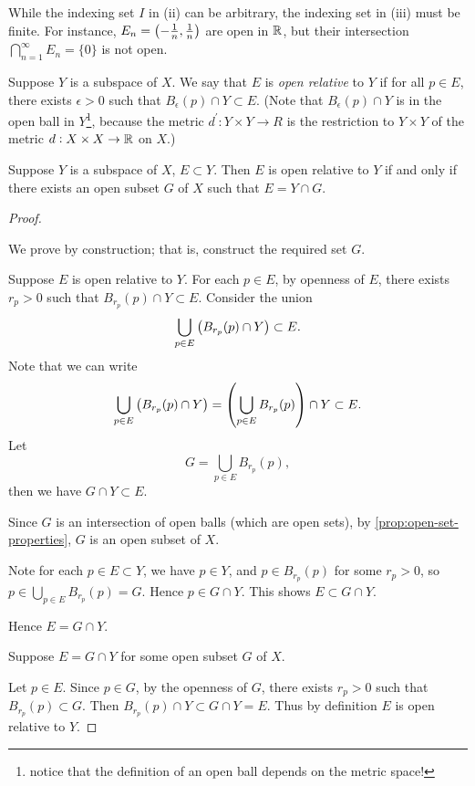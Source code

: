 \begin{remark}
While the indexing set $I$ in (ii) can be arbitrary, the indexing set in (iii) must be finite. For instance, $E_n=\left(-\frac{1}{n},\frac{1}{n}\right)$ are open in $\mathbb R$, but their intersection $\bigcap_{n=1}^\infty E_n=\{0\}$ is not open.
\end{remark}

Suppose $Y$ is a subspace of $X$. We say that $E$ is \emph{open relative} to $Y$ if for all $p\in E$, there exists $\epsilon>0$ such that $B_\epsilon(p)\cap Y\subset E$. (Note that $B_\epsilon(p)\cap Y$ is in the open ball in $Y$\footnote{notice that the definition of an open ball depends on the metric space!}, because the metric $d^\prime:Y\times Y\to R$ is the restriction to $Y\times Y$ of the metric $d:X\times X\to\mathbb R$ on $X$.)

\begin{proposition}\label{prop:open-subspace-cap}
Suppose $Y$ is a subspace of $X$, $E\subset Y$. Then $E$ is open relative to $Y$ if and only if there exists an open subset $G$ of $X$ such that $E=Y\cap G$.
\end{proposition}

\begin{proof} \

\fbox{$\implies$} We prove by construction; that is, construct the required set $G$.

Suppose $E$ is open relative to $Y$. For each $p\in E$, by openness of $E$, there exists $r_p>0$ such that $B_{r_p}(p)\cap Y\subset E$.
Consider the union
\[\bigcup_{p\in E}\left(B_{r_p}(p)\cap Y\right)\subset E.\]
Note that we can write
\[\bigcup_{p\in E}\left(B_{r_p}(p)\cap Y\right)=\left(\bigcup_{p\in E}B_{r_p}(p)\right)\cap Y\subset E.\]
Let
\[G=\bigcup_{p\in E}B_{r_p}(p),\]
then we have $G\cap Y\subset E$. 

Since $G$ is an intersection of open balls (which are open sets), by \cref{prop:open-set-properties}, $G$ is an open subset of $X$.

Note for each $p\in E\subset Y$, we have $p\in Y$, and $p\in B_{r_p}(p)$ for some $r_p>0$, so $p\in\bigcup_{p\in E}B_{r_p}(p)=G$. Hence $p\in G\cap Y$. This shows $E\subset G\cap Y$.

Hence $E=G\cap Y$.

\fbox{$\impliedby$} Suppose $E=G\cap Y$ for some open subset $G$ of $X$. 

Let $p\in E$. Since $p\in G$, by the openness of $G$, there exists $r_p>0$ such that $B_{r_p}(p)\subset G$. Then $B_{r_p}(p)\cap Y\subset G\cap Y=E$. Thus by definition $E$ is open relative to $Y$.
\end{proof}

